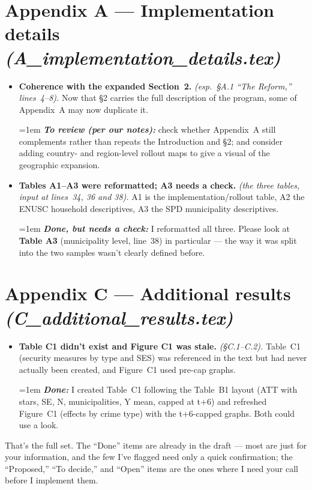 \documentclass[11pt]{article}
\newcommand{\where}[1]{{\small\textit{#1}}}
\newcommand{\fix}[1]{\smallskip\par\hangindent=1em \textbf{\itshape #1}}
\begin{document}
\section*{Appendix A --- Implementation details \where{(A\_implementation\_details.tex)}}
\begin{itemize}
\item \textbf{Coherence with the expanded Section~2.} \where{(esp.\ \S A.1 ``The Reform,'' lines~4--8).} Now that \S2 carries the full description of the program, some of Appendix~A may now duplicate it.
\fix{To review (per our notes):} check whether Appendix~A still complements rather than repeats the Introduction and \S2; and consider adding country- and region-level rollout maps to give a visual of the geographic expansion.
\item \textbf{Tables A1--A3 were reformatted; A3 needs a check.} \where{(the three tables, input at lines~34, 36 and 38).} A1 is the implementation/rollout table, A2 the ENUSC household descriptives, A3 the SPD municipality descriptives.
\fix{Done, but needs a check:} I reformatted all three. Please look at \textbf{Table A3} (municipality level, line~38) in particular --- the way it was split into the two samples wasn't clearly defined before.
\end{itemize}

\section*{Appendix C --- Additional results \where{(C\_additional\_results.tex)}}
\begin{itemize}
\item \textbf{Table C1 didn't exist and Figure C1 was stale.} \where{(\S C.1--C.2).} Table~C1 (security measures by type and SES) was referenced in the text but had never actually been created, and Figure~C1 used pre-cap graphs.
\fix{Done:} I created Table~C1 following the Table~B1 layout (ATT with stars, SE, N, municipalities, Y mean, capped at t+6) and refreshed Figure~C1 (effects by crime type) with the t+6-capped graphs. Both could use a look.
\end{itemize}

\vspace{8pt}
That's the full set. The ``Done'' items are already in the draft --- most are just for your information, and the few I've flagged need only a quick confirmation; the ``Proposed,'' ``To decide,'' and ``Open'' items are the ones where I need your call before I implement them.
\end{document}
